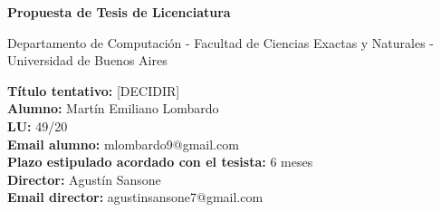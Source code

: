 \begin{titlepage}
\begin{center}

\vspace*{0.5cm}

\huge\bfseries
Propuesta de Tesis de Licenciatura

\vspace*{0.5cm}

\large Departamento de Computación - Facultad de Ciencias Exactas y Naturales - Universidad de Buenos Aires

\end{center}

\vspace*{0.5cm}

\noindent
\textbf{Título tentativo:} [DECIDIR] \\
\textbf{Alumno:} Martín Emiliano Lombardo \\
\textbf{LU:} 49/20 \\
\textbf{Email alumno:} mlombardo9@gmail.com \\
\textbf{Plazo estipulado acordado con el tesista:} 6 meses
\\
\textbf{Director:} Agustín Sansone \\
\textbf{Email director:} agustinsansone7@gmail.com \\

\vspace*{\fill}
\end{titlepage}
